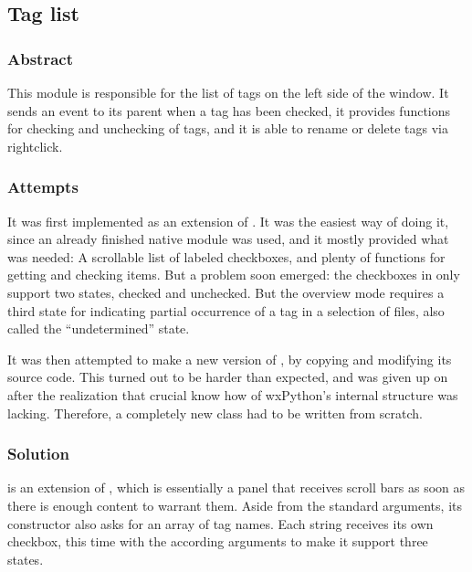 \subsection{Tag list}

\subsubsection{Abstract}

This module is responsible for the list of tags on the left side of the window.
It sends an event to its parent  when a tag has been
checked, it provides functions for checking and unchecking of tags, and it is
able to rename or delete tags via rightclick.

\subsubsection{Attempts}

It was first implemented as an extension of . It was
the easiest way of doing it, since an already finished native module was used,
and it mostly provided what was needed: A scrollable list of labeled
checkboxes, and plenty of functions for getting and checking items. But a
problem soon emerged: the checkboxes in  only support
two states, checked and unchecked. But the overview mode requires a third state
for indicating partial occurrence of a tag in a selection of files, also called
the ``undetermined'' state.

It was then attempted to make a new version of , by
copying and modifying its source code. This turned out to be harder than
expected, and was given up on after the realization that crucial know how of
wxPython's internal structure was lacking. Therefore, a
completely new class had to be written from scratch.

\subsubsection{Solution}

 is an extension of , which is
essentially a panel that receives scroll bars as soon as there is enough
content to warrant them. Aside from the standard arguments, its constructor
also asks for an array of tag names. Each string receives its own checkbox,
this time with the according arguments to make it support three states.

